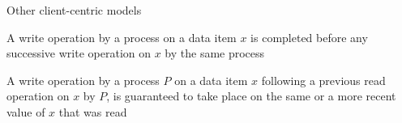 \begin{frame}{Other client-centric models}

\begin{definition}
A write operation by a process on a data item $x$ is completed before any
successive write operation on $x$ by the same process
\end{definition}


% 
% 
% 

\begin{definition}
A write operation by a process $P$ on a data item $x$ following a previous 
read operation on $x$ by $P$, is guaranteed to take place on the same or a 
more recent value of $x$ that was read
\end{definition}



\end{frame}


